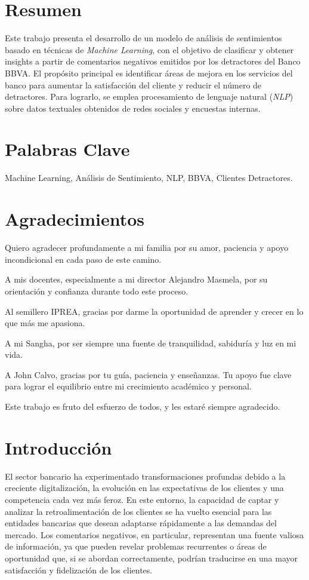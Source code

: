 \documentclass{matematicasud}
\begin{document}
\maketitle

\section*{Resumen}
Este trabajo presenta el desarrollo de un modelo de análisis de sentimientos basado en técnicas de \textit{Machine Learning}, con el objetivo de clasificar y obtener insights a partir de comentarios negativos emitidos por los detractores del Banco BBVA. El propósito principal es identificar áreas de mejora en los servicios del banco para aumentar la satisfacción del cliente y reducir el número de detractores. Para lograrlo, se emplea procesamiento de lenguaje natural (\textit{NLP}) sobre datos textuales obtenidos de redes sociales y encuestas internas.

\section*{Palabras Clave}
Machine Learning, Análisis de Sentimiento, NLP, BBVA, Clientes Detractores.

\section*{Agradecimientos}
Quiero agradecer profundamente a mi familia por su amor, paciencia y apoyo incondicional en cada paso de este camino. 

A mis docentes, especialmente a mi director Alejandro Masmela, por su orientación y confianza durante todo este proceso.

Al semillero IPREA, gracias por darme la oportunidad de aprender y crecer en lo que más me apasiona.

A mi Sangha, por ser siempre una fuente de tranquilidad, sabiduría y luz en mi vida.

A John Calvo, gracias por tu guía, paciencia y enseñanzas. Tu apoyo fue clave para lograr el equilibrio entre mi crecimiento académico y personal.

Este trabajo es fruto del esfuerzo de todos, y les estaré siempre agradecido.

\newpage
\tableofcontents
\newpage

\section{Introducción}
El sector bancario ha experimentado transformaciones profundas debido a la creciente digitalización, la evolución en las expectativas de los clientes y una competencia cada vez más feroz. En este entorno, la capacidad de captar y analizar la retroalimentación de los clientes se ha vuelto esencial para las entidades bancarias que desean adaptarse rápidamente a las demandas del mercado. Los comentarios negativos, en particular, representan una fuente valiosa de información, ya que pueden revelar problemas recurrentes o áreas de oportunidad que, si se abordan correctamente, podrían traducirse en una mayor satisfacción y fidelización de los clientes.
\end{document}
